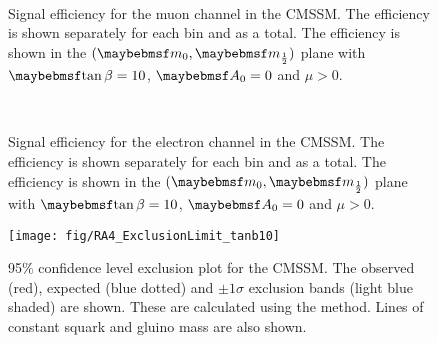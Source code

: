 \begin{figure}
\centering
{}
\\
\caption[Signal efficiency for the muon channel in the \ac{CMSSM}]{Signal
  efficiency for the muon channel in the \ac{CMSSM}. The efficiency is shown
  separately for each \STlep bin and as a total. The efficiency is shown in the
  $(\Mzero, \Mhalf)$ plane with $\tanbeta=10$, $\Azero=0$ and $\mu > 0$.}
\label{fig:inter_msugra_mu}
\end{figure}

\begin{figure}
\centering
{}
\\
\caption[Signal efficiency for the electron channel in the \ac{CMSSM}]{Signal
  efficiency for the electron channel in the \ac{CMSSM}. The efficiency is shown
  separately for each \STlep bin and as a total. The efficiency is shown in the
  $(\Mzero, \Mhalf)$ plane with $\tanbeta=10$, $\Azero=0$ and $\mu > 0$.}
\label{fig:inter_msugra_el}
\end{figure}

\begin{figure}
\texttt{[image: fig/RA4\_ExclusionLimit\_tanb10]}
\caption[95\% confidence level exclusion plot for the \ac{CMSSM}]{95\%
  confidence level exclusion plot for the \ac{CMSSM}. The observed (red),
  expected (blue dotted) and $\pm 1\sigma$ exclusion bands (light blue shaded)
  are shown. These are calculated using the \CLs method. Lines of constant
  squark and gluino mass are also shown.}
\label{fig:inter_msugra_exclusion}
\end{figure}

